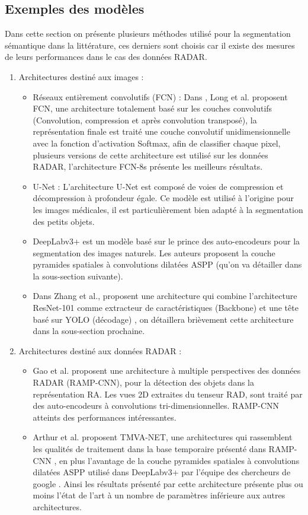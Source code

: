 \subsection{Exemples des modèles}
Dans cette section on présente plusieurs méthodes utilisé pour la segmentation sémantique dans la littérature, ces derniers sont choisis car il existe des mesures de leurs performances dans le cas des données RADAR. 
\begin{enumerate}
  \item Architectures destiné aux images : 
  \begin{itemize}
    \item Réseaux entièrement convolutifs (FCN) : Dans \cite{46}, Long et al. proposent FCN, une architecture totalement basé sur les couches convolutifs (Convolution, compression et après convolution transposé), la représentation finale est traité une couche convolutif unidimensionnelle avec la fonction d'activation Softmax, afin de classifier chaque pixel, plusieurs versions de cette architecture est utilisé sur les données RADAR, l'architecture FCN-8s présente les meilleurs résultats. 
    \item U-Net : L'architecture U-Net \cite{47} est composé de voies de compression et décompression à profondeur égale. Ce modèle est utilisé à l'origine pour les images médicales, il est particulièrement bien adapté à la segmentation des petits objets.
    \item DeepLabv3+ \cite{48} est un modèle basé sur le prince des auto-encodeurs pour la segmentation des images naturels. Les auteurs proposent la couche pyramides spatiales à convolutions dilatées ASPP (qu'on va détailler dans la sous-section suivante).
    \item Dans \cite{32} Zhang et al., proposent une architecture qui combine l'architecture ResNet-101 \cite{51} comme extracteur de caractéristiques (Backbone) et une tête basé sur YOLO (décodage) \cite{26}, on détaillera brièvement cette architecture dans la sous-section prochaine.
  \end{itemize}
  \item Architectures destiné aux données RADAR : 
  \begin{itemize}
    \item Gao et al. \cite{49} proposent une architecture à multiple perspectives des données RADAR (RAMP-CNN), pour la détection des objets dans la représentation RA. Les vues 2D extraites du tenseur RAD, sont traité par des auto-encodeurs à convolutions tri-dimensionnelles. RAMP-CNN atteints des performances intéressantes.
    \item Arthur et al. \cite{50} proposent TMVA-NET, une architectures qui rassemblent les qualités de traitement dans la base temporaire présenté dans RAMP-CNN \cite{49}, en plus l'avantage de la couche pyramides spatiales à convolutions dilatées ASPP utilisé dans DeepLabv3+ par l'équipe des chercheurs de google \cite{48}. Ainsi les résultats présenté par cette architecture présente plus ou moins l'état de l'art à un nombre de paramètres inférieure aux autres architectures.
  \end{itemize}
\end{enumerate}
